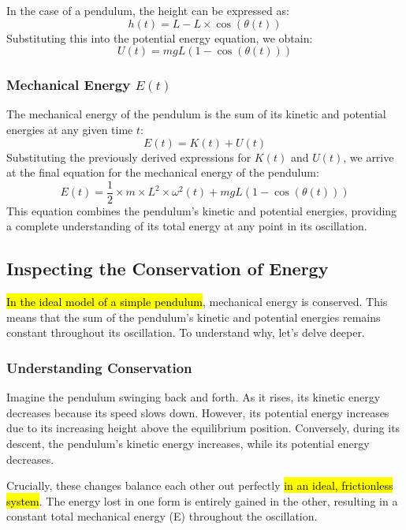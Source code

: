 \noindent In the case of a pendulum, the height can be expressed as: 
	\[h(t) = L - L \times \cos(\theta (t))\] 
\noindent Substituting this into the potential energy equation, we obtain: 
	\[U(t) = mgL(1 - \cos(\theta (t)))\]

\subsubsection{Mechanical Energy $E(t)$}

The mechanical energy of the pendulum is the sum of its kinetic and potential energies at any given time $t$: 
	\[E(t) = K(t) + U(t)\] 
\noindent Substituting the previously derived expressions for $K(t)$ and $U(t)$, we arrive at the final equation for the mechanical energy of the pendulum: 
	\[E(t) = \frac{1}{2} \times m \times L^{2} \times \omega^{2}(t) + mgL(1 - \cos(\theta (t)))\] 
\noindent This equation combines the pendulum's kinetic and potential energies, providing a complete understanding of its total energy at any point in its oscillation.

\newpage
\thispagestyle{plain}

\subsection{Inspecting the Conservation of Energy}

\hl{In the ideal model of a simple pendulum}, mechanical energy is conserved. This means that the sum of the pendulum's kinetic and potential energies remains constant throughout its oscillation. To understand why, let's delve deeper.

\subsubsection{Understanding Conservation}

Imagine the pendulum swinging back and forth. As it rises, its kinetic energy decreases because its speed slows down. However, its potential energy increases due to its increasing height above the equilibrium position. Conversely, during its descent, the pendulum's kinetic energy increases, while its potential energy decreases.

Crucially, these changes balance each other out perfectly \hl{in an ideal, frictionless system}. The energy lost in one form is entirely gained in the other, resulting in a constant total mechanical energy (E) throughout the oscillation.

